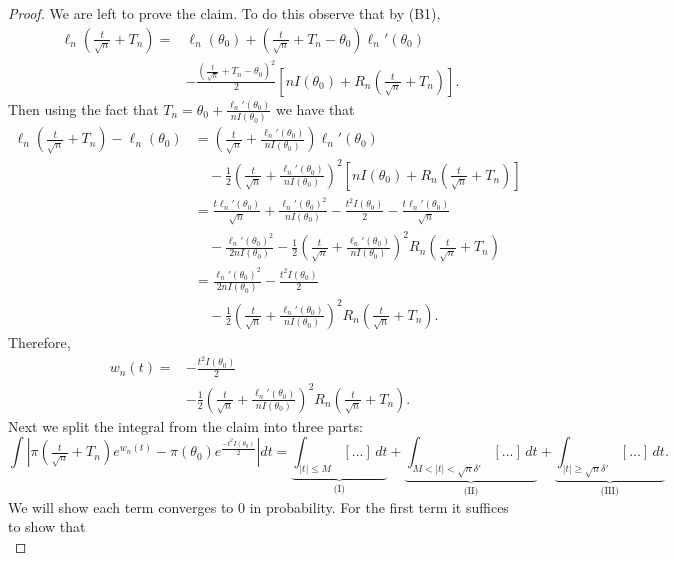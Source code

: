 \begin{proof}
	\bigskip \noindent We are left to prove the claim. To do this observe that by (B1),
	\begin{align*}
	\ell_n\!\left(\tfrac{t}{\sqrt n}+T_n\right)
	={}&\ell_n(\theta_0)
	+\left(\tfrac{t}{\sqrt n}+T_n-\theta_0\right)
	 \ell_n'(\theta_0) \\
	&-\frac{
	\left(\tfrac{t}{\sqrt n}+T_n-\theta_0\right)^2
	}{2}
	\left[
	nI(\theta_0)
	+R_n\!\left(\tfrac{t}{\sqrt n}+T_n\right)
	\right].
	\end{align*}
	Then using the fact that $T_n = \theta_0 + \frac{\ell_n'(\theta_0)}{nI(\theta_0)}$ we have that
	\begin{align*}
	\ell_n\!\left(\tfrac{t}{\sqrt n}+T_n\right)-\ell_n(\theta_0)
	&=
	\left(
	\tfrac{t}{\sqrt n}
	+\frac{\ell_n'(\theta_0)}{nI(\theta_0)}
	\right)\ell_n'(\theta_0) \\
	&\quad-
	\frac12
	\left(
	\tfrac{t}{\sqrt n}
	+\frac{\ell_n'(\theta_0)}{nI(\theta_0)}
	\right)^2
	\left[
	nI(\theta_0)
	+R_n\!\left(\tfrac{t}{\sqrt n}+T_n\right)
	\right] \\
	&=
	\frac{t\ell_n'(\theta_0)}{\sqrt n}
	+\frac{\ell_n'(\theta_0)^2}{nI(\theta_0)}
	-\frac{t^2I(\theta_0)}{2}
	-\frac{t\ell_n'(\theta_0)}{\sqrt n} \\
	&\quad-
	\frac{\ell_n'(\theta_0)^2}{2nI(\theta_0)}
	-\frac12
	\left(
	\tfrac{t}{\sqrt n}
	+\frac{\ell_n'(\theta_0)}{nI(\theta_0)}
	\right)^2
	R_n\!\left(\tfrac{t}{\sqrt n}+T_n\right) \\
	&=
	\frac{\ell_n'(\theta_0)^2}{2nI(\theta_0)}
	-\frac{t^2I(\theta_0)}{2} \\
	&\quad-
	\frac12
	\left(
	\tfrac{t}{\sqrt n}
	+\frac{\ell_n'(\theta_0)}{nI(\theta_0)}
	\right)^2
	R_n\!\left(\tfrac{t}{\sqrt n}+T_n\right).
	\end{align*}
	Therefore,
	\begin{align*}
	w_n(t)
	={}&-\frac{t^2I(\theta_0)}{2} \\
	&-\frac12
	\left(
	\tfrac{t}{\sqrt n}
	+\frac{\ell_n'(\theta_0)}{nI(\theta_0)}
	\right)^2
	R_n\!\left(\tfrac{t}{\sqrt n}+T_n\right).
	\end{align*}
	Next we split the integral from the claim into three parts: \[
 		\int \left| \pi\left(\tfrac{t}{\sqrt{n}} + T_n \right) e^{w_n(t)} - \pi(\theta_0) e^{\frac{-t^2 I(\theta_0)}{2}} \right| dt = \underbrace{\int_{|t| \leq M} [...] \, dt}_{\text{(I)}} + \underbrace{\int_{M < |t| < \sqrt{n}\delta' } [...] \, dt}_{\text{(II)}} + \underbrace{\int_{|t| \geq \sqrt{n}\delta'} [...] \, dt}_{\text{(III)}}.
 	\] We will show each term converges to $0$ in probability. For the first term it suffices to show that \[
\]
\end{proof}
